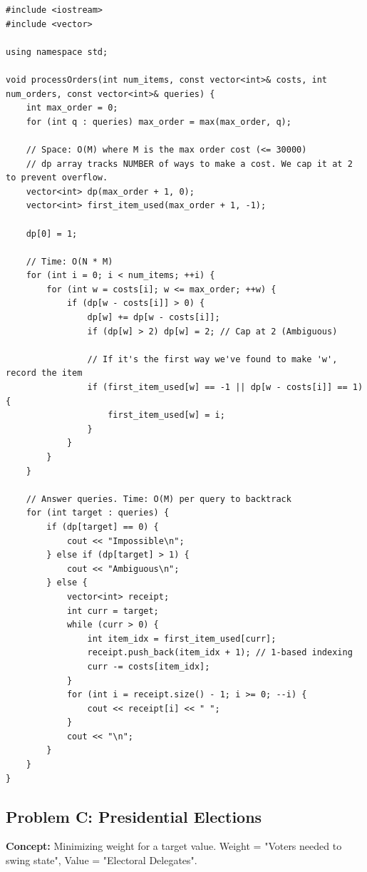 \begin{lstlisting}
#include <iostream>
#include <vector>

using namespace std;

void processOrders(int num_items, const vector<int>& costs, int num_orders, const vector<int>& queries) {
    int max_order = 0;
    for (int q : queries) max_order = max(max_order, q);
    
    // Space: O(M) where M is the max order cost (<= 30000)
    // dp array tracks NUMBER of ways to make a cost. We cap it at 2 to prevent overflow.
    vector<int> dp(max_order + 1, 0);
    vector<int> first_item_used(max_order + 1, -1);
    
    dp[0] = 1;
    
    // Time: O(N * M)
    for (int i = 0; i < num_items; ++i) {
        for (int w = costs[i]; w <= max_order; ++w) {
            if (dp[w - costs[i]] > 0) {
                dp[w] += dp[w - costs[i]];
                if (dp[w] > 2) dp[w] = 2; // Cap at 2 (Ambiguous)
                
                // If it's the first way we've found to make 'w', record the item
                if (first_item_used[w] == -1 || dp[w - costs[i]] == 1) {
                    first_item_used[w] = i; 
                }
            }
        }
    }
    
    // Answer queries. Time: O(M) per query to backtrack
    for (int target : queries) {
        if (dp[target] == 0) {
            cout << "Impossible\n";
        } else if (dp[target] > 1) {
            cout << "Ambiguous\n";
        } else {
            vector<int> receipt;
            int curr = target;
            while (curr > 0) {
                int item_idx = first_item_used[curr];
                receipt.push_back(item_idx + 1); // 1-based indexing
                curr -= costs[item_idx];
            }
            for (int i = receipt.size() - 1; i >= 0; --i) {
                cout << receipt[i] << " ";
            }
            cout << "\n";
        }
    }
}
\end{lstlisting}

\subsection{Problem C: Presidential Elections}
\textbf{Concept:} Minimizing weight for a target value. Weight = "Voters needed to swing state", Value = "Electoral Delegates".

